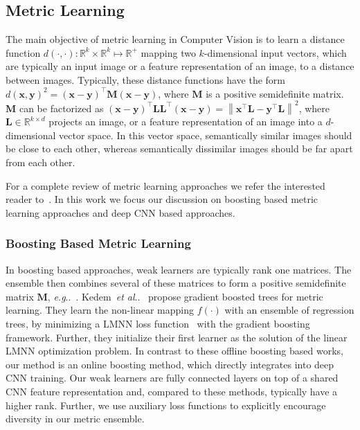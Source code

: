 \documentclass[10pt,journal,compsoc]{IEEEtran}
\makeatletter
\newcommand{\norm}[1]{\left\lVert#1\right\rVert}
\DeclareRobustCommand\onedot{\futurelet\@let@token\@onedot}
\def\@onedot{\ifx\@let@token.\else.\null\fi\xspace}
\def\eg{\emph{e.g}\onedot} \def\Eg{\emph{E.g}\onedot}
\def\etal{\emph{et al}\onedot}
\makeatother
\begin{document}
\subsection{Metric Learning}\label{sec:related-work-metric-learning}The main objective of metric learning in Computer Vision is to learn a distance
function $d(\cdot, \cdot): \mathbb{R}^k \times \mathbb{R}^k \mapsto \mathbb{R}^+$
mapping two $k$-dimensional input vectors, which are typically an input image
or a feature representation of an image, to a distance between images. 
Typically, these
distance functions have the form ${d(\boldsymbol{x}, \boldsymbol{y})^2 =
(\boldsymbol{x} - \boldsymbol{y})^\top \boldsymbol{M} (\boldsymbol{x} -
\boldsymbol{y})}$, where $\boldsymbol{M}$ is a positive semidefinite matrix. $\boldsymbol{M}$ can be
factorized as  ${(\boldsymbol{x} - \boldsymbol{y})^\top
\boldsymbol{L}\boldsymbol{L}^{\top} (\boldsymbol{x} - \boldsymbol{y}) =
\norm{\boldsymbol{x^{\top}L} - \boldsymbol{y^{\top}L}}^2}$, where $\boldsymbol{L} \in
\mathbb{R}^{k \times d}$ projects an image, or a feature representation of an
image into a $d$-dimensional vector space. In this vector space, semantically similar
images should be close to each other, whereas semantically dissimilar images should be far apart from each other.


For a complete review of metric learning approaches we refer the interested reader to~\cite{bellet2013survey}. 
In this work we focus our discussion on boosting based metric learning approaches and deep \ac{CNN} based approaches.

\subsubsection{Boosting Based Metric Learning}
In boosting based approaches, weak learners are typically rank one matrices. The
ensemble then combines several of these matrices to form a positive semidefinite
matrix $\boldsymbol{M}$, \eg~\cite{bi2011adaboost, liu2012robust, negrelbmvc16,
shen2012positive}. 
Kedem~\etal~\cite{kedem2012non} propose gradient boosted trees for metric learning. They learn the non-linear mapping 
$f(\cdot)$ with an ensemble of regression trees, by minimizing a \ac{LMNN} loss function~\cite{weinberger2009distance} with the gradient boosting framework.
Further, they initialize their first learner as the solution of the linear \ac{LMNN} optimization problem.
In contrast to these offline boosting based works, our method is an online boosting method, which directly integrates into deep \ac{CNN} training.
Our weak learners are fully connected layers on top of a shared \ac{CNN} feature representation and, compared to these methods, typically have a higher rank. Further, we use auxiliary loss
functions to explicitly encourage diversity in our metric ensemble.
\end{document}
